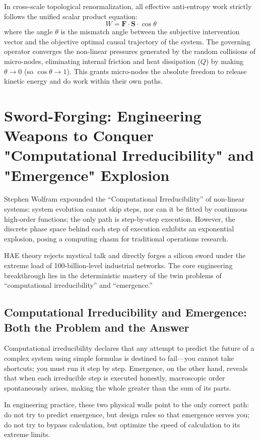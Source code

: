 \documentclass{article}
\begin{document}
In cross-scale topological renormalization, all effective anti-entropy work strictly follows the unified scalar product equation:
\begin{equation}
    W = \mathbf{F} \cdot \mathbf{S} \cdot \cos \theta
\end{equation}
where the angle $\theta$ is the mismatch angle between the subjective intervention vector and the objective optimal causal trajectory of the system. The governing operator converges the non-linear pressures generated by the random collisions of micro-nodes, eliminating internal friction and heat dissipation ($Q$) by making $\theta \to 0$ (so $\cos\theta \to 1$). This grants micro-nodes the absolute freedom to release kinetic energy and do work within their own paths.

\section{Sword-Forging: Engineering Weapons to Conquer "Computational Irreducibility" and "Emergence" Explosion}
\label{sword-forging}

Stephen Wolfram expounded the ``Computational Irreducibility'' of non-linear systems: system evolution cannot skip steps, nor can it be fitted by continuous high-order functions; the only path is step-by-step execution. However, the discrete phase space behind each step of execution exhibits an exponential explosion, posing a computing chasm for traditional operations research.

HAE theory rejects mystical talk and directly forges a silicon sword under the extreme load of 100-billion-level industrial networks. The core engineering breakthrough lies in the deterministic mastery of the twin problems of ``computational irreducibility'' and ``emergence.''

\subsection{Computational Irreducibility and Emergence: Both the Problem and the Answer}
Computational irreducibility declares that any attempt to predict the future of a complex system using simple formulas is destined to fail---you cannot take shortcuts; you must run it step by step. Emergence, on the other hand, reveals that when each irreducible step is executed honestly, macroscopic order spontaneously arises, making the whole greater than the sum of its parts.

In engineering practice, these two physical walls point to the only correct path: do not try to predict emergence, but design rules so that emergence serves you; do not try to bypass calculation, but optimize the speed of calculation to its extreme limits.
\end{document}
